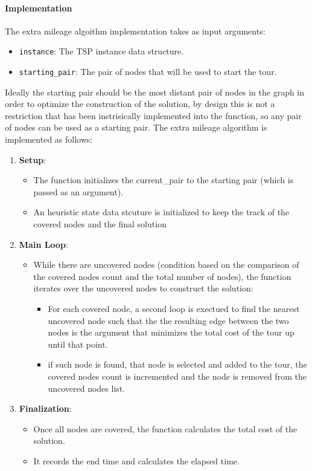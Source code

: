 \documentclass{article}
\begin{document}
\paragraph{Implementation}
The extra mileage algoithm implementation takes as input arguments:
\begin{itemize}
	\item \texttt{instance}: The TSP instance data structure.
	\item \texttt{starting\_pair}: The pair of nodes that will be used to start the tour.
\end{itemize}
Ideally the starting pair should be the most distant pair of nodes in the graph in order to optimize the construction of the solution,
by design this is not a restriction that has been instrisically implemented into the function, so any pair of nodes can be used as a starting pair.
The extra mileage algorithm is implemented as follows:
\begin{enumerate} 
	\item \textbf{Setup}:
	\begin{itemize}
		\item The function initializes the current\_pair to the starting pair (which is passed as an argument).
		\item An heuristic state data stcuture is initialized to keep the track of the covered nodes and the final solution 
	\end{itemize}
	\item \textbf{Main Loop}:
	      \begin{itemize}
		      \item While there are uncovered nodes (condition based on the comparison of the covered nodes count and the total number of nodes), 
			  the function iterates over the uncovered nodes to construct the solution:
		            \begin{itemize}
			            \item For each covered node, a second loop is exectued to find the nearest uncovered node such that 
			            the the resulting edge between the two nodes is the argument that minimizes the total cost of the tour up until that point.
			            \item if such node is found, that node is selected and added to the tour, 
						the covered nodes count is incremented and the node is removed from the uncovered nodes list.
		            \end{itemize}
	      \end{itemize}
		
	\item \textbf{Finalization}:
	      \begin{itemize}
		      \item Once all nodes are covered, the function calculates the total cost of the solution.
		      \item It records the end time and calculates the elapsed time.
	      \end{itemize}
\end{enumerate}
\end{document}
